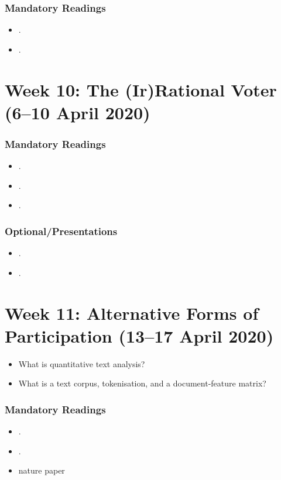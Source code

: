 \documentclass[abstract=on,parskip=full,headings=standardclasses,fontsize=11pt,paper=a4]{scrartcl}
\begin{document}
\subsubsection*{Mandatory Readings}

\begin{itemize}
\item {}.
\item {}.
\end{itemize}



 
\section{Week 10: The (Ir)Rational Voter (6--10 April 2020)}


\subsubsection*{Mandatory Readings}


 \begin{itemize}
\item {}.
\item {}.
\item {}.
\end{itemize}

\subsubsection*{Optional/Presentations}
\begin{itemize}
\item {}.
\item {}.
\end{itemize}



\section{Week 11: Alternative Forms of Participation (13--17 April 2020)}

\begin{itemize}
\renewcommand\labelitemi{--}
\item What is quantitative text analysis?
\item What is a text corpus, tokenisation, and a document-feature matrix?
\end{itemize}

\subsubsection*{Mandatory Readings}
\begin{itemize}
\item {}.
\item {}.
\item nature paper
\end{itemize}
\end{document}
